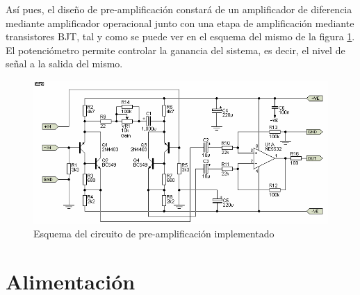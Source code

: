 Así pues, el diseño de pre-amplificación constará de un amplificador de diferencia mediante amplificador operacional junto con una etapa de amplificación mediante transistores BJT, tal y como se puede ver en el esquema del mismo de la figura \ref{fig:circuit}. El potenciómetro permite controlar la ganancia del sistema, es decir, el nivel de señal a la salida del mismo.

\begin{figure}[!htb]
\begin{center}
\includegraphics[width=14cm]{img/circuito.png}
\caption{\label{fig:circuit}Esquema del circuito de pre-amplificación implementado}
\end{center}
\end{figure}

\section{Alimentación}
	